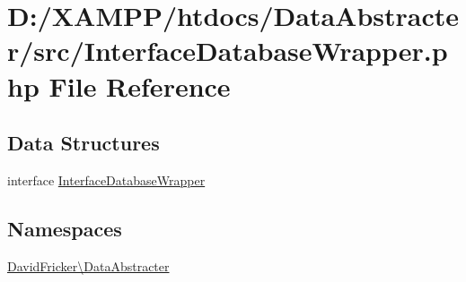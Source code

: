 \hypertarget{_interface_database_wrapper_8php}{}\section{D\+:/\+X\+A\+M\+P\+P/htdocs/\+Data\+Abstracter/src/\+Interface\+Database\+Wrapper.php File Reference}
\label{_interface_database_wrapper_8php}
\subsection*{Data Structures}
\begin{DoxyCompactItemize}
\item 
interface \hyperlink{interface_david_fricker_1_1_data_abstracter_1_1_interface_database_wrapper}{Interface\+Database\+Wrapper}
\end{DoxyCompactItemize}
\subsection*{Namespaces}
\begin{DoxyCompactItemize}
\item 
 \hyperlink{namespace_david_fricker_1_1_data_abstracter}{David\+Fricker\textbackslash{}\+Data\+Abstracter}
\end{DoxyCompactItemize}
